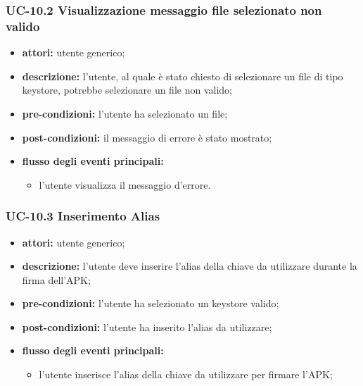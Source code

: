 \subsubsection*{UC-10.2 Visualizzazione messaggio file selezionato non valido}
\begin{itemize}
    \item \textbf{attori:} utente generico;
    \item \textbf{descrizione:} l'utente, al quale è stato chiesto di selezionare un file di tipo keystore, potrebbe selezionare un file non valido;
    \item \textbf{pre-condizioni:} l'utente ha selezionato un file;
    \item \textbf{post-condizioni:} il messaggio di errore è stato mostrato;
    \item \textbf{flusso degli eventi principali:}
    \begin{itemize}
        \item l'utente visualizza il messaggio d'errore.
    \end{itemize}
\end{itemize}
\subsubsection*{UC-10.3 Inserimento Alias}
\begin{itemize}
    \item \textbf{attori:} utente generico;
    \item \textbf{descrizione:} l'utente deve inserire l'alias della chiave da utilizzare durante la firma dell'APK;
    \item \textbf{pre-condizioni:} l'utente ha selezionato un keystore valido;
    \item \textbf{post-condizioni:} l'utente ha inserito l'alias da utilizzare;
    \item \textbf{flusso degli eventi principali:}
    \begin{itemize}
        \item l'utente inserisce l'alias della chiave da utilizzare per firmare l'APK;
    \end{itemize}
\end{itemize}
